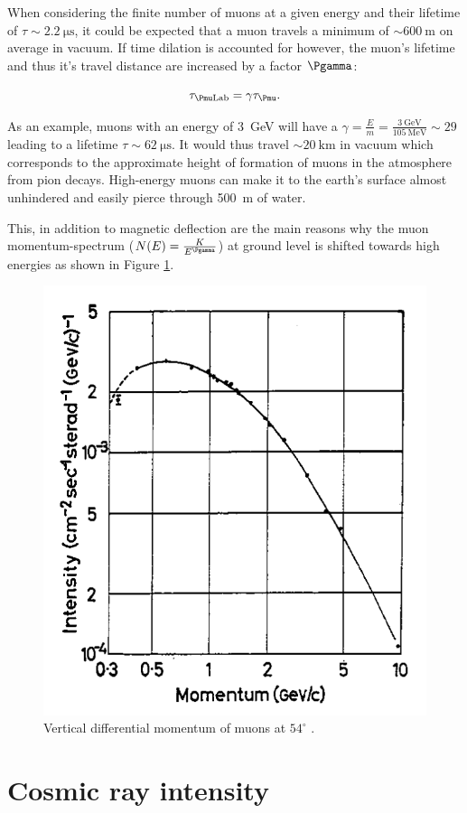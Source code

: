 When considering the finite number of muons at a given energy and their lifetime of $\tau\sim\SI{2.2}{\micro\second}$, it could be expected that a muon travels a minimum of $\sim \SI{600}{\meter}$ on average in vacuum. If time dilation is accounted for however, the muon's lifetime and thus it's travel distance are increased by a factor $\Pgamma$:

\begin{equation}
\tau_{\Pmu\text{Lab}}=\gamma\tau_{\Pmu}.
\end{equation}

As an example, muons with an energy of \SI{3}{\giga\electronvolt} will have a $\gamma=\frac{E}{m}=\frac{\SI{3}{\giga\electronvolt}}{\SI{105}{\mega\electronvolt}}\sim 29$ leading to a lifetime $\tau \sim \SI{62}{\micro\second}$. It would thus travel $\sim \SI{20}{\kilo\meter}$ in vacuum which corresponds to the approximate height of formation of muons in the atmosphere from pion decays. High-energy muons can make it to the earth's surface almost unhindered and easily pierce through \SI{500}{\meter} of water.

This, in addition to magnetic deflection are the main reasons why the muon momentum-spectrum ($N(E)=\frac{K}{E^{\Pgamma}}$) at ground level is shifted towards high energies as shown in Figure \ref{fig:shift}.

\begin{figure}[htbp]
\centering
\includegraphics[width=0.5\linewidth]{./fig/shiftDur.png}
\caption{Vertical differential momentum of muons at $54^\circ$ \cite{Gardener_1962}.}
\label{fig:shift}
\end{figure}


\section{Cosmic ray intensity}

